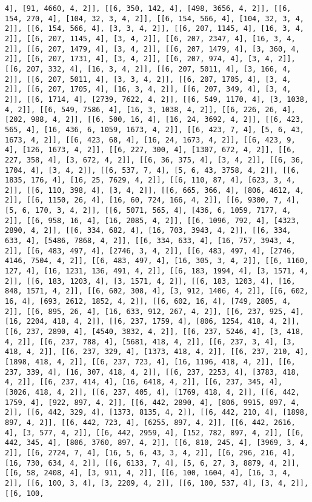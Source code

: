 \documentclass[12pt,fleqn]{article}\usepackage{../../common}
\begin{document}
\begin{verbatim}
4], [91, 4660, 4, 2]], [[6, 350, 142, 4], [498, 3656, 4, 2]], [[6, 154, 270, 4], [104, 32, 3, 4, 2]], [[6, 154, 566, 4], [104, 32, 3, 4, 2]], [[6, 154, 566, 4], [3, 3, 4, 2]], [[6, 207, 1145, 4], [16, 3, 4, 2]], [[6, 207, 1145, 4], [3, 4, 2]], [[6, 207, 2347, 4], [16, 3, 4, 2]], [[6, 207, 1479, 4], [3, 4, 2]], [[6, 207, 1479, 4], [3, 360, 4, 2]], [[6, 207, 1731, 4], [3, 4, 2]], [[6, 207, 974, 4], [3, 4, 2]], [[6, 207, 332, 4], [16, 3, 4, 2]], [[6, 207, 5011, 4], [3, 166, 4, 2]], [[6, 207, 5011, 4], [3, 3, 4, 2]], [[6, 207, 1705, 4], [3, 4, 2]], [[6, 207, 1705, 4], [16, 3, 4, 2]], [[6, 207, 349, 4], [3, 4, 2]], [[6, 1714, 4], [2739, 7622, 4, 2]], [[6, 549, 1170, 4], [3, 1038, 4, 2]], [[6, 549, 7586, 4], [16, 3, 1038, 4, 2]], [[6, 226, 26, 4], [202, 988, 4, 2]], [[6, 500, 16, 4], [16, 24, 3692, 4, 2]], [[6, 423, 565, 4], [16, 436, 6, 1059, 1673, 4, 2]], [[6, 423, 7, 4], [5, 6, 43, 1673, 4, 2]], [[6, 423, 68, 4], [16, 24, 1673, 4, 2]], [[6, 423, 9, 4], [126, 1673, 4, 2]], [[6, 227, 300, 4], [1307, 672, 4, 2]], [[6, 227, 358, 4], [3, 672, 4, 2]], [[6, 36, 375, 4], [3, 4, 2]], [[6, 36, 1704, 4], [3, 4, 2]], [[6, 537, 7, 4], [5, 6, 43, 3758, 4, 2]], [[6, 1835, 176, 4], [16, 25, 7629, 4, 2]], [[6, 110, 87, 4], [623, 3, 4, 2]], [[6, 110, 398, 4], [3, 4, 2]], [[6, 665, 366, 4], [806, 4612, 4, 2]], [[6, 1150, 26, 4], [16, 60, 724, 166, 4, 2]], [[6, 9300, 7, 4], [5, 6, 170, 3, 4, 2]], [[6, 5071, 565, 4], [436, 6, 1059, 7177, 4, 2]], [[6, 958, 16, 4], [16, 2085, 4, 2]], [[6, 1096, 792, 4], [4323, 2890, 4, 2]], [[6, 334, 682, 4], [16, 703, 3943, 4, 2]], [[6, 334, 633, 4], [5486, 7868, 4, 2]], [[6, 334, 633, 4], [16, 757, 3943, 4, 2]], [[6, 483, 497, 4], [2746, 3, 4, 2]], [[6, 483, 497, 4], [2746, 4146, 7504, 4, 2]], [[6, 483, 497, 4], [16, 305, 3, 4, 2]], [[6, 1160, 127, 4], [16, 1231, 136, 491, 4, 2]], [[6, 183, 1994, 4], [3, 1571, 4, 2]], [[6, 183, 1203, 4], [3, 1571, 4, 2]], [[6, 183, 1203, 4], [16, 848, 1571, 4, 2]], [[6, 602, 308, 4], [3, 912, 1406, 4, 2]], [[6, 602, 16, 4], [693, 2612, 1852, 4, 2]], [[6, 602, 16, 4], [749, 2805, 4, 2]], [[6, 895, 26, 4], [16, 633, 912, 267, 4, 2]], [[6, 237, 925, 4], [16, 2204, 418, 4, 2]], [[6, 237, 1759, 4], [806, 1254, 418, 4, 2]], [[6, 237, 2890, 4], [4540, 3832, 4, 2]], [[6, 237, 5246, 4], [3, 418, 4, 2]], [[6, 237, 788, 4], [5681, 418, 4, 2]], [[6, 237, 3, 4], [3, 418, 4, 2]], [[6, 237, 329, 4], [1373, 418, 4, 2]], [[6, 237, 210, 4], [1898, 418, 4, 2]], [[6, 237, 723, 4], [16, 1196, 418, 4, 2]], [[6, 237, 339, 4], [16, 307, 418, 4, 2]], [[6, 237, 2253, 4], [3783, 418, 4, 2]], [[6, 237, 414, 4], [16, 6418, 4, 2]], [[6, 237, 345, 4], [3026, 418, 4, 2]], [[6, 237, 405, 4], [1769, 418, 4, 2]], [[6, 442, 1759, 4], [922, 897, 4, 2]], [[6, 442, 2890, 4], [806, 9915, 897, 4, 2]], [[6, 442, 329, 4], [1373, 8135, 4, 2]], [[6, 442, 210, 4], [1898, 897, 4, 2]], [[6, 442, 723, 4], [6255, 897, 4, 2]], [[6, 442, 2616, 4], [3, 577, 4, 2]], [[6, 442, 2959, 4], [152, 782, 897, 4, 2]], [[6, 442, 345, 4], [806, 3760, 897, 4, 2]], [[6, 810, 245, 4], [3969, 3, 4, 2]], [[6, 2724, 7, 4], [16, 5, 6, 43, 3, 4, 2]], [[6, 296, 216, 4], [16, 730, 634, 4, 2]], [[6, 6133, 7, 4], [5, 6, 27, 3, 8879, 4, 2]], [[6, 58, 2408, 4], [3, 911, 4, 2]], [[6, 100, 1604, 4], [16, 3, 4, 2]], [[6, 100, 3, 4], [3, 2209, 4, 2]], [[6, 100, 537, 4], [3, 4, 2]], [[6, 100, 
\end{verbatim}
\end{document}
